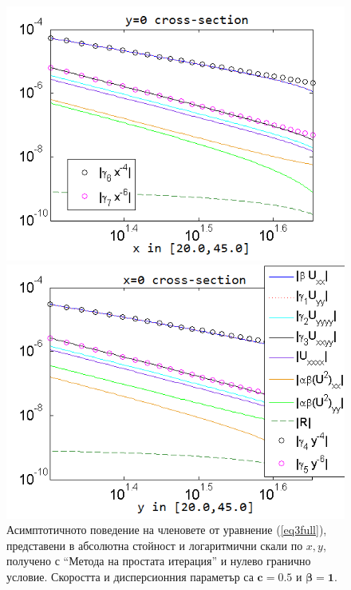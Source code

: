 \documentclass{article}
\newcommand{\rf}[1]{(\ref{#1})}
\begin{document}
\begin{figure}[ht]
	\begin{minipage}[b]{0.95\linewidth}
		\raggedleft
		\includegraphics[width=\linewidth]{AssymptForEachTerm/bt1_c010_090/ChristovIC_AlongX_50_ZB2_bt1_c050_h020_O(h^6).png}
	\end{minipage}
	\begin{minipage}[b]{0.95\linewidth}
		 \raggedright
		\includegraphics[width=\linewidth]{AssymptForEachTerm/bt1_c010_090/ChristovIC_AlongY_50_ZB2_bt1_c050_h020_O(h^6).png}
	\end{minipage}
	\caption{Асимптотичното поведение на членовете от уравнение \rf{eq3full}, представени в абсолютна стойност и логаритмични скали по $x,y$, получено с ``Метода на простата итерация'' и нулево гранично условие. Скоростта и дисперсионния параметър са $\boldsymbol{c=0.5}$ и $\boldsymbol{\beta = 1}$. }
	\label{fig:assympt_beta1c05}
\end{figure}
\FloatBarrier
\end{document}
